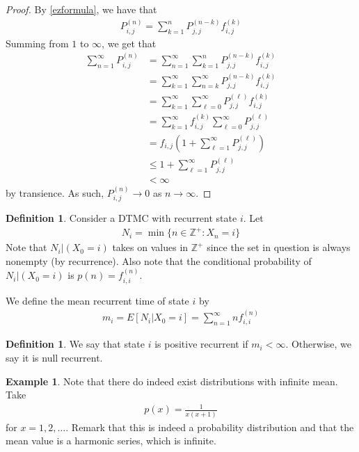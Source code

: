 \documentclass[11pt]{amsart}
\theoremstyle{definition}
\newtheorem{definition}[theorem]{Definition}
\newtheorem{example}[theorem]{Example}
\numberwithin{equation}{section}
\begin{document}
 \begin{proof}
     By \ref{ezformula}, we have that
     \begin{align*}
         P_{i,j}^{(n)}=\sum_{k=1}^nP_{j,j}^{(n-k)}f_{i,j}^{(k)}
     \end{align*}
     Summing from $1$ to $\infty$, we get that
     \begin{align*}
         \sum_{n=1}^\infty P_{i,j}^{(n)}&=\sum_{n=1}^\infty\sum_{k=1}^nP_{j,j}^{(n-k)}f_{i,j}^{(k)}\\
         &=\sum_{k=1}^\infty\sum_{n=k}^\infty P_{j,j}^{(n-k)}f_{i,j}^{(k)}\\
         &=\sum_{k=1}^\infty\sum_{\ell=0}^\infty P_{j,j}^{(\ell)}f_{i,j}^{(k)}\\
         &=\sum_{k=1}^\infty f_{i,j}^{(k)}\sum_{\ell=0}^\infty P_{j,j}^{(\ell)}\\
         &=f_{i,j}(1+\sum_{\ell=1}^\infty P_{j,j}^{(\ell)})\\
         &\le 1+\sum_{\ell=1}^\infty P_{j,j}^{(\ell)}\\
         &<\infty
     \end{align*}
     by transience. As such, $P_{i,j}^{(n)}\to0$ as $n\to\infty$.
 \end{proof}
 \begin{definition}
     Consider a DTMC with recurrent state $i$. Let 
     \begin{align*}
         N_i=\min\{n\in\mathbb Z^+:X_n=i\}
     \end{align*}
     Note that $N_i|(X_0=i)$ takes on values in $\mathbb Z^+$ since the set in question is always nonempty (by recurrence). Also note that the conditional probability of $N_i|(X_0=i)$ is $p(n)=f_{i,i}^{(n)}$.

     We define the mean recurrent time of state $i$ by
     \begin{align*}
         m_i=E[N_i|X_0=i]=\sum_{n=1}^\infty nf_{i,i}^{(n)}
     \end{align*}
 \end{definition}
 \begin{definition}
     We say that state $i$ is positive recurrent if $m_i<\infty$. Otherwise, we say it is null recurrent.
 \end{definition}
 \begin{example}
     Note that there do indeed exist distributions with infinite mean. Take
     \begin{align*}
         p(x)=\frac{1}{x(x+1)}
     \end{align*}
     for $x=1,2,\ldots$. Remark that this is indeed a probability distribution and that the mean value is a harmonic series, which is infinite.
 \end{example}
\end{document}
